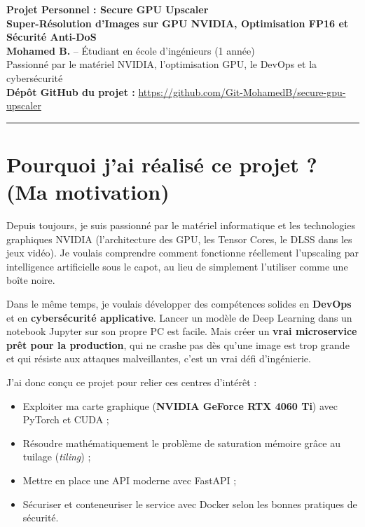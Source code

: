 \documentclass[11pt,a4paper]{article}
\begin{document}
\begin{center}
    {\LARGE\bfseries\color{primary} Projet Personnel : Secure GPU Upscaler}\\[0.2cm]
    {\large\textbf{Super-Résolution d'Images sur GPU NVIDIA, Optimisation FP16 et Sécurité Anti-DoS}}\\[0.25cm]
    \textbf{Mohamed B.} -- Étudiant en école d'ingénieurs (1\iere{} année)\\[0.1cm]
    Passionné par le matériel NVIDIA, l'optimisation GPU, le DevOps et la cybersécurité\\[0.1cm]
    \textbf{Dépôt GitHub du projet :} \url{https://github.com/Git-MohamedB/secure-gpu-upscaler}
\end{center}

\vspace{0.2cm}
\hrule
\vspace{0.4cm}

\section{Pourquoi j'ai réalisé ce projet ? (Ma motivation)}

Depuis toujours, je suis passionné par le matériel informatique et les technologies graphiques NVIDIA (l'architecture des GPU, les Tensor Cores, le DLSS dans les jeux vidéo). Je voulais comprendre comment fonctionne réellement l'upscaling par intelligence artificielle sous le capot, au lieu de simplement l'utiliser comme une boîte noire.

Dans le même temps, je voulais développer des compétences solides en \textbf{DevOps} et en \textbf{cybersécurité applicative}. Lancer un modèle de Deep Learning dans un notebook Jupyter sur son propre PC est facile. Mais créer un \textbf{vrai microservice prêt pour la production}, qui ne crashe pas dès qu'une image est trop grande et qui résiste aux attaques malveillantes, c'est un vrai défi d'ingénierie.

J'ai donc conçu ce projet pour relier ces centres d'intérêt :
\begin{itemize}[noitemsep]
    \item Exploiter ma carte graphique (\textbf{NVIDIA GeForce RTX 4060 Ti}) avec PyTorch et CUDA ;
    \item Résoudre mathématiquement le problème de saturation mémoire grâce au tuilage (\textit{tiling}) ;
    \item Mettre en place une API moderne avec FastAPI ;
    \item Sécuriser et conteneuriser le service avec Docker selon les bonnes pratiques de sécurité.
\end{itemize}
\end{document}

